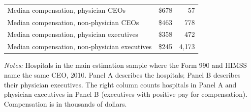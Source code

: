 \begin{table}
\begin{threeparttable}
\begin{tabular}[t]{lrr}
\hspace{1em}Median compensation, physician CEOs & \$678 & 57\\
\hspace{1em}Median compensation, non-physician CEOs & \$463 & 778\\
\hspace{1em}Median compensation, physician executives & \$358 & 472\\
\hspace{1em}Median compensation, non-physician executives & \$245 & 4,173\\
\bottomrule
\end{tabular}
\begin{tablenotes}[flushleft]
\footnotesize
\item \textit{Notes:} Hospitals in the main estimation sample where the Form 990 and HIMSS name the same CEO, 2010. Panel A describes the hospitals; Panel B describes their physician executives. The right column counts hospitals in Panel A and physician executives in Panel B (executives with positive pay for compensation). Compensation is in thousands of dollars.
\end{tablenotes}
\end{threeparttable}
\end{table}
